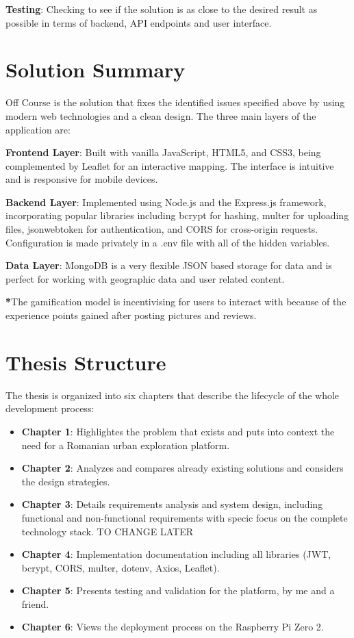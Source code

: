 \documentclass[12pt,a4paper]{report}
\begin{document}
\textbf{Testing}: Checking to see if the solution is as close to the desired result as possible in terms of backend, API endpoints and user interface.

\section*{Solution Summary}

Off Course is the solution that fixes the identified issues specified above by using modern web technologies and a clean design. The three main layers of the application are:

\textbf{Frontend Layer}: Built with vanilla JavaScript, HTML5, and CSS3, being complemented by Leaflet for an interactive mapping. The interface is intuitive and is responsive for mobile devices.

\textbf{Backend Layer}: Implemented using Node.js and the Express.js framework, incorporating popular libraries including bcrypt for hashing, multer for uploading files, jsonwebtoken for authentication, and CORS for cross-origin requests. Configuration is made privately in a .env file with all of the hidden variables.

\textbf{Data Layer}: MongoDB is a very flexible JSON based storage for data and is perfect for working with geographic data and user related content.

\textbf{*}The gamification model is incentivising for users to interact with because of the experience points gained after posting pictures and reviews.

\section*{Thesis Structure}

The thesis is organized into six chapters that describe the lifecycle of the whole development process:

\begin{itemize}
    \item \textbf{Chapter 1}: Highlightes the problem that exists and puts into context the need for a Romanian urban exploration platform.
    
    \item \textbf{Chapter 2}: Analyzes and compares already existing solutions and considers the design strategies.
    
    \item \textbf{Chapter 3}: Details requirements analysis and system design, including functional
and non-functional requirements with specic focus on the complete technology
stack. TO CHANGE LATER
    
    \item \textbf{Chapter 4}: Implementation documentation including all libraries (JWT, bcrypt, CORS, multer, dotenv, Axios, Leaflet).
    
    \item \textbf{Chapter 5}: Presents testing and validation for the platform, by me and a friend.
    
    \item \textbf{Chapter 6}: Views the deployment process on the Raspberry Pi Zero 2.
\end{itemize}
\end{document}
